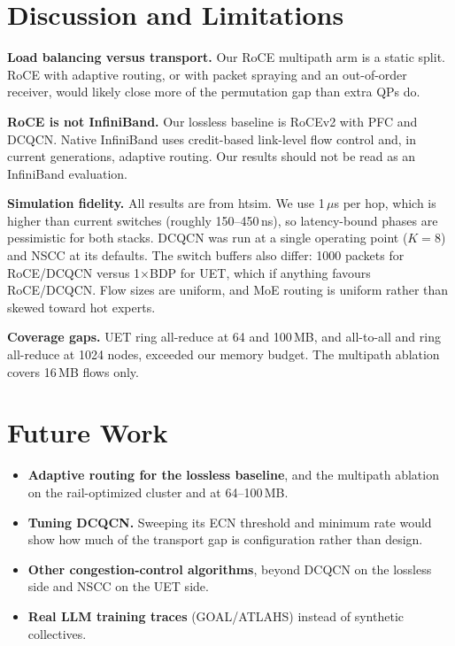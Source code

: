 \documentclass[conference]{IEEEtran}
\begin{document}
\section{Discussion and Limitations}
\label{sec:discussion}

\textbf{Load balancing versus transport.}
Our RoCE multipath arm is a static split. RoCE with adaptive routing, or with
packet spraying and an out-of-order receiver, would likely close more of the
permutation gap than extra QPs do.

\textbf{RoCE is not InfiniBand.}
Our lossless baseline is RoCEv2 with PFC and DCQCN. Native InfiniBand uses
credit-based link-level flow control and, in current generations, adaptive
routing. Our results should not be read as an InfiniBand evaluation.

\textbf{Simulation fidelity.}
All results are from htsim. We use 1\,$\mu$s per hop, which is higher than
current switches (roughly 150--450\,ns), so latency-bound phases are pessimistic
for both stacks. DCQCN was run at a single operating point ($K{=}8$) and NSCC at
its defaults. The switch buffers also differ: 1000 packets for RoCE/DCQCN versus
1$\times$BDP for UET, which if anything favours RoCE/DCQCN. Flow sizes are
uniform, and MoE routing is uniform rather than skewed toward hot experts.

\textbf{Coverage gaps.}
UET ring all-reduce at 64 and 100\,MB, and all-to-all and ring all-reduce at
1024 nodes, exceeded our memory budget. The multipath ablation covers 16\,MB
flows only.

\section{Future Work}
\label{sec:future}

\begin{itemize}
  \item \textbf{Adaptive routing for the lossless baseline}, and the multipath
        ablation on the rail-optimized cluster and at 64--100\,MB.
  \item \textbf{Tuning DCQCN.} Sweeping its ECN threshold and minimum rate
        would show how much of the transport gap is configuration rather than
        design.
  \item \textbf{Other congestion-control algorithms}, beyond DCQCN on the
        lossless side and NSCC on the UET side.
  \item \textbf{Real LLM training traces} (GOAL/ATLAHS) instead of synthetic
        collectives.
\end{itemize}
\end{document}
